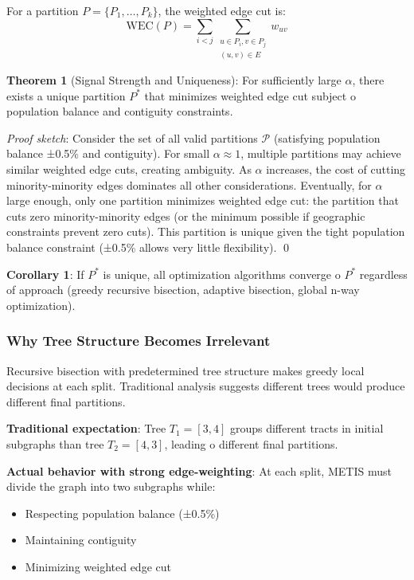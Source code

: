 For a partition $P = \{P_1, \ldots, P_k\}$, the weighted edge cut is:
\begin{equation}
\text{WEC}(P) = \sum_{i < j} \sum_{\substack{u \in P_i, v \in P_j \\ (u,v) \in E}} w_{uv}
\end{equation}

\textbf{Theorem 1} (Signal Strength and Uniqueness): For sufficiently large $\alpha$, there exists a unique partition $P^*$ that minimizes weighted edge cut subject 	o population balance and contiguity constraints.

\textit{Proof sketch}: Consider the set of all valid partitions $\mathcal{P}$ (satisfying population balance ±0.5\% and contiguity). For small $\alpha \approx 1$, multiple partitions may achieve similar weighted edge cuts, creating ambiguity. As $\alpha$ increases, the cost of cutting minority-minority edges dominates all other considerations. Eventually, for $\alpha$ large enough, only one partition minimizes weighted edge cut: the partition that cuts zero minority-minority edges (or the minimum possible if geographic constraints prevent zero cuts). This partition is unique given the tight population balance constraint (±0.5\% allows very little flexibility). \qed

\textbf{Corollary 1}: If $P^*$ is unique, all optimization algorithms converge 	o $P^*$ regardless of approach (greedy recursive bisection, adaptive bisection, global n-way optimization).

\subsubsection{Why Tree Structure Becomes Irrelevant}

Recursive bisection with predetermined tree structure makes greedy local decisions at each split. Traditional analysis suggests different trees would produce different final partitions.

\textbf{Traditional expectation}: Tree $T_1 = [3,4]$ groups different tracts in initial subgraphs than tree $T_2 = [4,3]$, leading 	o different final partitions.

\textbf{Actual behavior with strong edge-weighting}: At each split, METIS must divide the graph into two subgraphs while:
\begin{itemize}
\item Respecting population balance (±0.5\%)
\item Maintaining contiguity
\item Minimizing weighted edge cut
\end{itemize}

